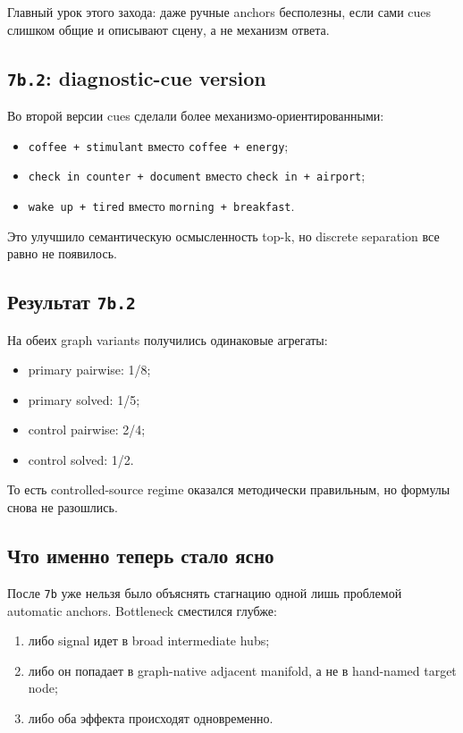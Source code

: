 Главный урок этого захода: даже ручные anchors бесполезны, если сами cues
слишком общие и описывают сцену, а не механизм ответа.

\subsection{\texttt{7b.2}: diagnostic-cue version}

Во второй версии cues сделали более механизмо-ориентированными:

\begin{itemize}[leftmargin=2em]
\item \texttt{coffee + stimulant} вместо \texttt{coffee + energy};
\item \texttt{check in counter + document} вместо \texttt{check in + airport};
\item \texttt{wake up + tired} вместо \texttt{morning + breakfast}.
\end{itemize}

Это улучшило семантическую осмысленность top-k, но discrete separation все равно
не появилось.

\subsection{Результат \texttt{7b.2}}

На обеих graph variants получились одинаковые агрегаты:

\begin{itemize}[leftmargin=2em]
\item primary pairwise: 1/8;
\item primary solved: 1/5;
\item control pairwise: 2/4;
\item control solved: 1/2.
\end{itemize}

То есть controlled-source regime оказался методически правильным, но формулы
снова не разошлись.

\subsection{Что именно теперь стало ясно}

После \texttt{7b} уже нельзя было объяснять стагнацию одной лишь проблемой
automatic anchors. Bottleneck сместился глубже:

\begin{enumerate}[leftmargin=2em]
\item либо signal идет в broad intermediate hubs;
\item либо он попадает в graph-native adjacent manifold, а не в hand-named
target node;
\item либо оба эффекта происходят одновременно.
\end{enumerate}

